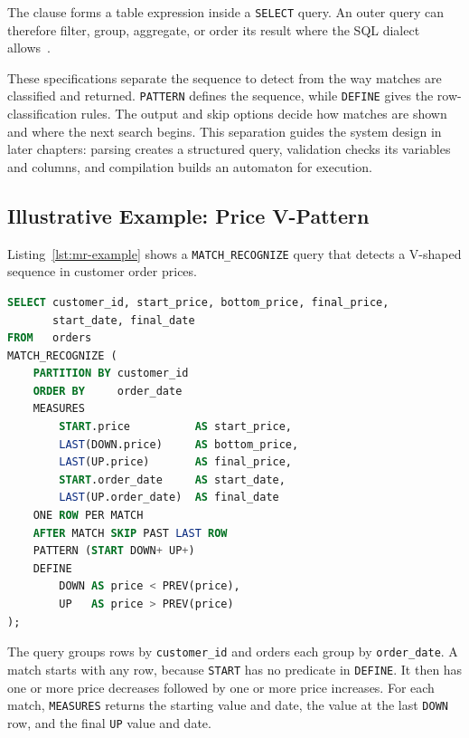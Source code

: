 The clause forms a table expression inside a \texttt{SELECT} query.
An outer query can therefore filter, group, aggregate, or order its
result where the SQL dialect allows~\cite{winand_match_recognize}.

These specifications separate the sequence to detect from the way
matches are classified and returned.  \texttt{PATTERN} defines the
sequence, while \texttt{DEFINE} gives the row-classification rules.
The output and skip options decide how matches are shown and where the
next search begins.  This separation guides the system design in later
chapters: parsing creates a structured query, validation checks its
variables and columns, and compilation builds an automaton for
execution.


\subsection{Illustrative Example: Price V-Pattern}
\label{subsec:bg-example}

Listing~\ref{lst:mr-example} shows a \texttt{MATCH\_RECOGNIZE}
query that detects a V-shaped sequence in customer order prices.

\begin{lstlisting}[float=htbp,
    language = SQL,
    caption  = {Detecting V-shaped price patterns with \texttt{MATCH\_RECOGNIZE}},
    label    = {lst:mr-example}
]
SELECT customer_id, start_price, bottom_price, final_price,
       start_date, final_date
FROM   orders
MATCH_RECOGNIZE (
    PARTITION BY customer_id
    ORDER BY     order_date
    MEASURES
        START.price          AS start_price,
        LAST(DOWN.price)     AS bottom_price,
        LAST(UP.price)       AS final_price,
        START.order_date     AS start_date,
        LAST(UP.order_date)  AS final_date
    ONE ROW PER MATCH
    AFTER MATCH SKIP PAST LAST ROW
    PATTERN (START DOWN+ UP+)
    DEFINE
        DOWN AS price < PREV(price),
        UP   AS price > PREV(price)
);
\end{lstlisting}


The query groups rows by \texttt{customer\_id} and orders each group by
\texttt{order\_date}.  A match starts with any row, because
\texttt{START} has no predicate in \texttt{DEFINE}.  It then has one or
more price decreases followed by one or more price increases.  For each
match, \texttt{MEASURES} returns the starting value and date, the value
at the last \texttt{DOWN} row, and the final \texttt{UP} value and date.

